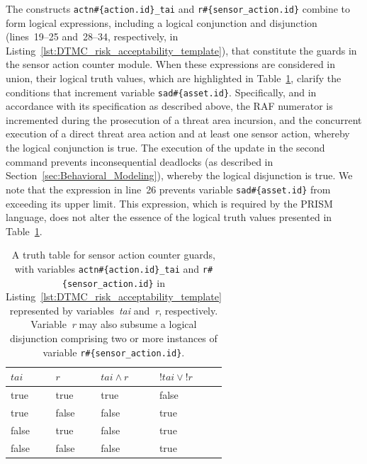 The constructs \texttt{actn\#\{action.id\}\_tai} and \texttt{r\#\{sensor\_action.id\}} combine to form logical expressions, including a logical conjunction and disjunction (lines~19--25 and~28--34, respectively, in Listing~\ref{lst:DTMC_risk_acceptability_template}), that constitute the guards in the sensor action counter module. When these expressions are considered in union, their logical truth values, which are highlighted in Table~\ref{tab:sensor_action_counter_module_truth_table}, clarify the conditions that increment variable \texttt{sad\#\{as\-set.id\}}. Specifically, and in accordance with its specification as described above, the RAF numerator is incremented during the prosecution of a threat area incursion, and the concurrent execution of a direct threat area action and at least one sensor action, whereby the logical conjunction is true. The execution of the update in the second command prevents inconsequential deadlocks (as described in Section~\ref{sec:Behavioral_Modeling}), whereby the logical disjunction is true. We note that the expression in line~26 prevents variable \texttt{sad\#\{asset.id\}} from exceeding its upper limit. This expression, which is required by the PRISM language, does not alter the essence of the logical truth values presented in Table~\ref{tab:sensor_action_counter_module_truth_table}.

\begin{table}[ht]
	\renewcommand*\arraystretch{1.3}
	\begin{tabularx}{\textwidth}{
			>{\centering\arraybackslash}X|
			>{\centering\arraybackslash}X|
			>{\centering\arraybackslash}X|
			>{\centering\arraybackslash}X
		}
		$tai$ & $r$ & $tai \wedge r$ & $!tai \vee !r$\\
		\hline
		true & true & \cellcolor{green!65}true & false\\
		\hline
		true & false & false & \cellcolor{green!65}true\\
		\hline
		false & true & false & \cellcolor{green!65}true\\
		\hline
		false & false & false & \cellcolor{green!65}true\\
	\end{tabularx}
	\caption[Risk acceptability truth table]{A truth table for sensor action counter guards, with variables \texttt{actn\#\{action.id\}\_tai} and \texttt{r\#\{sensor\_action.id\}} in Listing~\ref{lst:DTMC_risk_acceptability_template} represented by variables~\emph{tai} and~\emph{r}, respectively. Variable~\emph{r} may also subsume a logical disjunction comprising two or more instances of variable \texttt{r\#\{sensor\_action.id\}}.}
	\label{tab:sensor_action_counter_module_truth_table}
\end{table}

